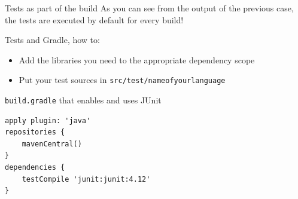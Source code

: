 \documentclass[presentation]{beamer}
\begin{document}
\begin{frame}[fragile]{Tests as part of the build}
	As you can see from the output of the previous case, the tests are executed by default for every build!
	\begin{block}{Tests and Gradle, how to:}
		\begin{itemize}
			\item Add the libraries you need to the appropriate dependency scope
			\item Put your test sources in \texttt{src/test/nameofyourlanguage}
		\end{itemize}
	\end{block}
	\begin{block}{\texttt{build.gradle} that enables and uses JUnit}
		\begin{verbatim}
apply plugin: 'java'
repositories {
    mavenCentral()
}
dependencies {
    testCompile 'junit:junit:4.12'
}
		\end{verbatim}
	\end{block}
\end{frame}
\end{document}
